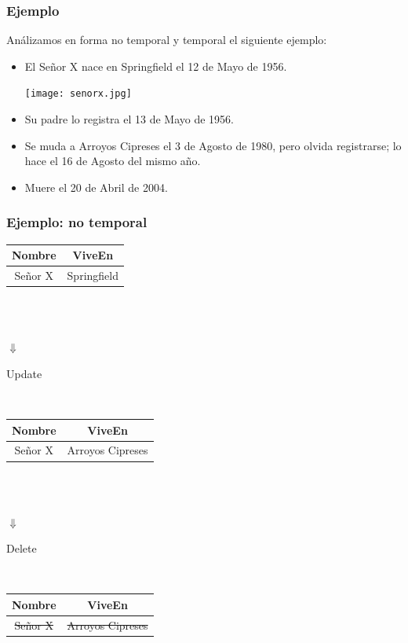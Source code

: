 \documentclass[a4paper,12pt,oneside]{report}
\begin{document}
\subsubsection*{Ejemplo}
An\'alizamos en forma no temporal y temporal el siguiente ejemplo:
\begin{itemize}
\item El Se\~nor X nace en Springfield el 12 de Mayo de 1956.
\begin{center}\texttt{[image: senorx.jpg]}\end{center}
\item Su padre lo registra el 13 de Mayo de 1956.
\item Se muda a Arroyos Cipreses el 3 de Agosto de 1980, pero olvida registrarse; lo hace el 16 de Agosto del mismo a\~no.
\item Muere el 20 de Abril de 2004.
\end{itemize}
\subsubsection*{Ejemplo: no temporal}
\begin{center}
\begin{tabular}{|c|c|}
\hline
Nombre & ViveEn\\
\hline
Se\~nor X & Springfield\\
\hline
\end{tabular}
\\
\ \\
\begin{Huge}{$\Downarrow$}\end{Huge}\begin{small}{Update}\end{small}\\
\begin{tabular}{|c|c|}
\hline
Nombre & ViveEn\\
\hline
Se\~nor X & Arroyos Cipreses\\
\hline
\end{tabular}
\\
\ \\
\begin{Huge}{$\Downarrow$}\end{Huge}\begin{small}{Delete}\end{small}\\
\begin{tabular}{|c|c|}
\hline
Nombre & ViveEn\\
\hline
\sout{Se\~nor X} & \sout{Arroyos Cipreses}\\
\hline
\end{tabular}
\end{center}
\end{document}

